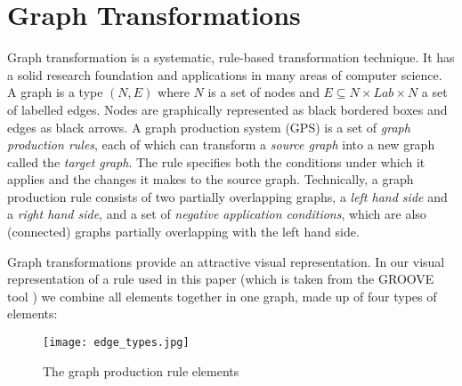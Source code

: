 \section{Graph Transformations}\label{sec:gratra}

Graph transformation is a systematic, rule-based transformation technique. It has a solid research foundation \cite{Handbook-GG-I} and applications in many areas of computer science.\\
A graph is a type $(N,E)$ where $N$ is a set of nodes and $E \subseteq N \times Lab \times N$ a set of labelled edges.  
Nodes are graphically represented as black bordered boxes and edges as black arrows.
A graph production system (GPS) is a set of \emph{graph production rules}, each of which can transform a \emph{source graph} into a new graph called the \emph{target graph}. The rule specifies both the conditions under which it applies and the changes it makes to the source graph. Technically, a graph production rule consists of two partially overlapping graphs, a \emph{left hand side} and a \emph{right hand side}, and a set of \emph{negative application conditions}, which are also (connected) graphs partially overlapping with the left hand side.

Graph transformations provide an attractive visual representation. In our visual representation of a rule used in this paper (which is taken from the {\sc GROOVE} tool \cite{Rens03d}) we combine all elements together in one graph, made up of four types of elements:

\begin{figure}
	\begin{center}
		\texttt{[image: edge\_types.jpg]}
	\end{center}
	\caption{The graph production rule elements}
	\label{fig:edge_types}
\end{figure}

